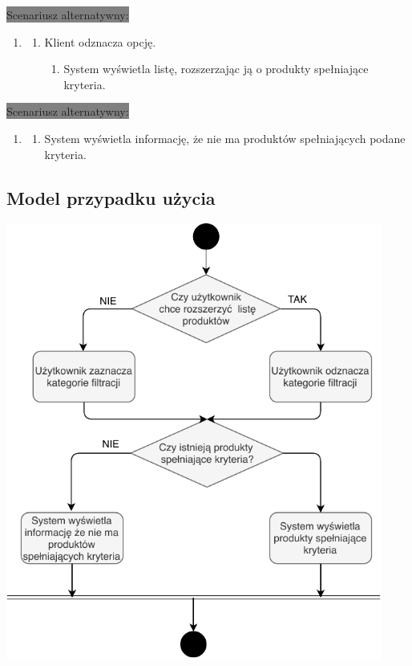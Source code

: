 \documentclass[12pt]{report}
\begin{document}
			\colorbox{grey}{Scenariusz alternatywny:}
			\begin{enumerate}\addtocounter{enumi}{1}
				\item[]
				\begin{enumerate}
					\item Klient odznacza opcję.
					\begin{enumerate}
						\item System wyświetla listę, rozszerzając ją o produkty spełniające kryteria.
					\end{enumerate}
				\end{enumerate}
			\end{enumerate}

	
			\colorbox{grey}{Scenariusz alternatywny:}
			\begin{enumerate}\addtocounter{enumi}{2}
				\item[]
				\begin{enumerate}
					\item System wyświetla informację, że nie ma produktów spełniających podane kryteria.
				\end{enumerate}
			\end{enumerate}

		\subsection{Model przypadku użycia}
			\begin{center}
				\includegraphics[width=350pt]{filtracja.pdf}
			\end{center}
		\newpage
		
\end{document}
